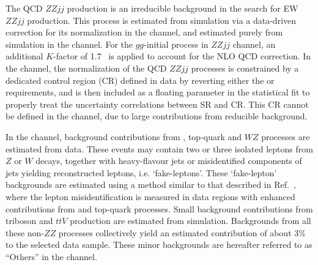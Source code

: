 The QCD $ZZjj$ production is an irreducible background in the search for EW $ZZjj$ production.
This process is estimated from simulation via a data-driven correction for its normalization in the \lllljj channel, and estimated purely from simulation in the \llvvjj channel.
For the $gg$-initial process in $ZZjj$ channel, an additional $K$-factor of 1.7~\cite{PhysRevD.92.094028} is applied to account for the NLO QCD correction.
In the \lllljj channel, the normalization of the QCD $ZZjj$ processes is constrained by a dedicated control region (CR) defined in data by reverting either the \mjj or \dyjj requirements,
and is then included as a floating parameter in the statistical fit to properly treat the uncertainty correlations between SR and CR.
This CR cannot be defined in the \llvvjj channel, due to large contributions from reducible background.

In the \lllljj channel, background contributions from \Zjet, top-quark and $WZ$ processes are estimated from data.
These events may contain two or three isolated leptons from $Z$ or $W$ decays, together with heavy-flavour jets or misidentified components of jets yielding reconstructed leptons, i.e. `fake-leptons'.
These `fake-lepton' backgrounds are estimated using a method similar to that described in Ref.~\cite{Aaboud:2017rwm},
where the lepton misidentification is measured in data regions with enhanced contributions from \Zjet and top-quark processes.
Small background contributions from triboson and $ttV$ production are estimated from simulation.
Backgrounds from all these non-$ZZ$ processes collectively yield an estimated contribution of about 3\% to the selected data sample. These minor backgrounds are hereafter referred to as ``Others'' in the \lllljj channel.

